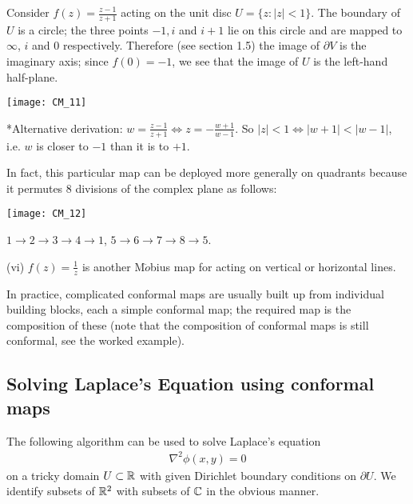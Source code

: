 \documentclass[a4paper]{article}
\begin{document}
\begin{eg}
Consider $f(z) = \frac{z-1}{z+1}$ acting on the unit disc $U=\{z:|z|<1\}$. The boundary of $U$ is a circle; the three points $-1,i$ and $i+1$ lie on this circle and are mapped to $\infty$, $i$ and $0$ respectively. Therefore (see section 1.5) the image of $\partial V$ is the imaginary axis; since $f(0) = -1$, we see that the image of $U$ is the left-hand half-plane.

\texttt{[image: CM\_11]}

*Alternative derivation: $w = \frac{z-1}{z+1} \iff z=-\frac{w+1}{w-1}$. So $|z| < 1 \iff |w+1|<|w-1|$, i.e. $w$ is closer to $-1$ than it is to $+1$.

In fact, this particular map can be deployed more generally on quadrants because it permutes $8$ divisions of the complex plane as follows:

\texttt{[image: CM\_12]}

$1 \to 2 \to 3 \to 4 \to 1$, $5 \to 6 \to 7 \to 8 \to 5$.

(vi) $f(z) = \frac{1}{z}$ is another M$\ddot{o}$bius map for acting on vertical or horizontal lines.
\end{eg}

In practice, complicated conformal maps are usually built up from individual building blocks, each a simple conformal map; the required map is the composition of these (note that the composition of conformal maps is still conformal, see the worked example).

\subsection{Solving Laplace's Equation using conformal maps}
The following algorithm can be used to solve Laplace's equation
\begin{equation*}
\begin{aligned}
\nabla^2 \phi(x,y) = 0
\end{aligned}
\end{equation*}
on a tricky domain $U \subset \mathbb{R}$ with given Dirichlet boundary conditions on $\partial U$. We identify subsets of $\mathbb{R}^2$ with subsets of $\mathbb{C}$ in the obvious manner.
\end{document}
